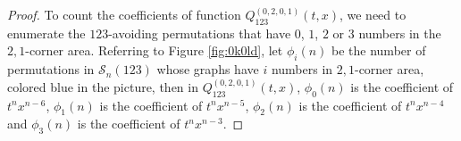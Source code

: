 \documentclass[
final,nomarks
]{dmtcs-episciences}
\newcommand{\fref}[1]{Figure \ref{fig:#1}}
\newcommand{\Sn}[1]{\mathcal{S}_{#1}}
\newcommand{\Qm}[1]{Q_{123}^{(#1)}(t,x)}
\begin{document}
\begin{proof}
	To count the coefficients of function \begin{math}\Qm{0,2,0,1}\end{math}, we need to enumerate the \begin{math}123\end{math}-avoiding permutations that have \begin{math}0\end{math}, \begin{math}1\end{math}, \begin{math}2\end{math} or \begin{math}3\end{math} numbers in the \begin{math}2,1\end{math}-corner area. Referring to \fref{0k0ld}, let \begin{math}\phi_i(n)\end{math} be the number of permutations in \begin{math}\Sn{n}(123)\end{math} whose graphs have \begin{math}i\end{math} numbers in \begin{math}2,1\end{math}-corner area, colored blue in the picture, then in \begin{math}\Qm{0,2,0,1}\end{math}, \begin{math}\phi_0(n)\end{math} is the coefficient of \begin{math}t^n x^{n-6}\end{math}, \begin{math}\phi_1(n)\end{math} is the coefficient of \begin{math}t^n x^{n-5}\end{math}, \begin{math}\phi_2(n)\end{math} is the coefficient of \begin{math}t^n x^{n-4}\end{math} and \begin{math}\phi_3(n)\end{math} is the coefficient of \begin{math}t^n x^{n-3}\end{math}. 
	

\end{proof}
\end{document}
